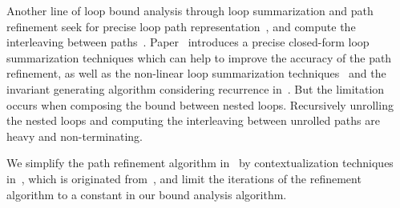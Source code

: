 \begin{itemize}
Another line of loop bound analysis through loop summarization and path refinement seek for precise loop path representation~\cite{ManoliosV06,BalakrishnanSIG09,SharmaDDA11,Flores-MontoyaH14,HumenbergerJK18,CyphertBKR19}, and compute the interleaving between paths~\cite{GulwaniJK09,ZulegerGSV11}.
Paper~\cite{KincaidBCR19} introduces a precise closed-form loop summarization techniques which can help to improve the accuracy of the path refinement, as well as the non-linear loop summarization techniques~\cite{KincaidCBR18} and the invariant generating algorithm considering recurrence in~\cite{BreckCKR20}. 
But the limitation occurs when composing the bound between nested loops. Recursively unrolling the nested loops and computing the interleaving between unrolled paths are heavy and non-terminating.


We simplify the path refinement algorithm in~\cite{GulwaniJK09} by contextualization techniques in~\cite{ZulegerGSV11,SinnZV14}, which is originated from~\cite{ManoliosV06},
and limit the iterations of the refinement algorithm to a constant in our bound analysis algorithm.
\end{itemize}
